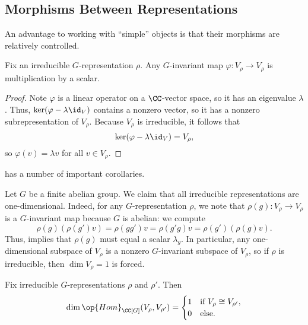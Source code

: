 \documentclass{article}
\begin{document}
\subsection{Morphisms Between Representations}
An advantage to working with ``simple'' objects is that their morphisms are relatively controlled.
\begin{theorem} \label{thm:schur}
	Fix an irreducible $G$-representation $\rho$. Any $G$-invariant map $\varphi\colon V_\rho\to V_\rho$ is multiplication by a scalar.
\end{theorem}
\begin{proof}
	Note $\varphi$ is a linear operator on a $\CC$-vector space, so it has an eigenvalue $\lambda$. Thus, $\ker(\varphi-\lambda{\id_V})$ contains a nonzero vector, so it has a nonzero subrepresentation of $V_\rho$. Because $V_\rho$ is irreducible, it follows that
	\[\ker(\varphi-\lambda{\id_V})=V_\rho,\]
	so $\varphi(v)=\lambda v$ for all $v\in V_\rho$.
\end{proof}
 has a number of important corollaries.
\begin{example}
	Let $G$ be a finite abelian group. We claim that all irreducible representations are one-dimensional. Indeed, for any $G$-representation $\rho$, we note that $\rho(g)\colon V_\rho\to V_\rho$ is a $G$-invariant map because $G$ is abelian: we compute
	\[\rho(g)(\rho(g')v)=\rho(gg')v=\rho(g'g)v=\rho(g')(\rho(g)v).\]
	Thus,  implies that $\rho(g)$ must equal a scalar $\lambda_g$. In particular, any one-dimensional subspace of $V_\rho$ is a nonzero $G$-invariant subspace of $V_\rho$, so if $\rho$ is irreducible, then $\dim V_\rho=1$ is forced.
\end{example}
\begin{corollary} \label{cor:irrep-morphisms}
	Fix irreducible $G$-representations $\rho$ and $\rho'$. Then
	\[\dim\op{Hom}_{\CC[G]}(V_\rho,V_{\rho'})=\begin{cases}
		1 & \text{if }V_\rho\cong V_{\rho'}, \\
		0 & \text{else}.
	\end{cases}\]
\end{corollary}
\end{document}
